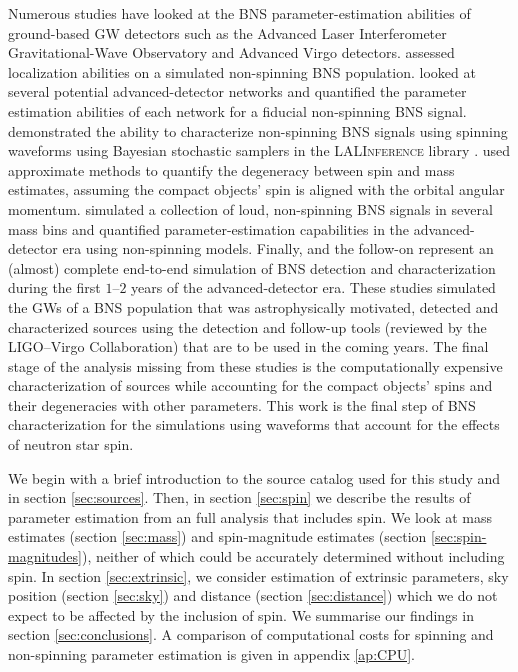 Numerous studies have looked at the BNS parameter-estimation abilities of ground-based GW detectors such as the Advanced Laser Interferometer Gravitational-Wave Observatory \citep[aLIGO;][]{Aasi_2015} and Advanced Virgo \citep[AdV;][]{Acernese_2014} detectors. \citet{Nissanke_2010,Nissanke_2011} assessed localization abilities on a simulated non-spinning BNS population. \citet{Veitch_2012} looked at several potential advanced-detector networks and quantified the parameter estimation abilities of each network for a fiducial non-spinning BNS signal. \citet{Aasi_2013} demonstrated the ability to characterize non-spinning BNS signals using spinning waveforms using Bayesian stochastic samplers in the \textsc{LALInference} library \citep{Veitch_2014}.  \citet{Hannam_2013} used approximate methods to quantify the degeneracy between spin and mass estimates, assuming the compact objects' spin is aligned with the orbital angular momentum. \citet{Rodriguez_2014} simulated a collection of loud, non-spinning BNS signals in several mass bins and quantified parameter-estimation capabilities in the advanced-detector era using non-spinning models.  Finally, \citet{Singer_2014} and the follow-on \citet{Berry_2014} represent an (almost) complete end-to-end simulation of BNS detection and characterization during the first $1$--$2$ years of the advanced-detector era. These studies simulated the GWs of a BNS population that was astrophysically motivated, detected and characterized sources using the detection and follow-up tools (reviewed by the LIGO--Virgo Collaboration) that are to be used in the coming years.   The final stage of the analysis missing from these studies is the computationally expensive characterization of sources while accounting for the compact objects' spins and their degeneracies with other parameters.  This work is the final step of BNS characterization for the \citet{Singer_2014} simulations using waveforms that account for the effects of neutron star spin.

We begin with a brief introduction to the source catalog used for this study and \citet{Singer_2014} in section \ref{sec:sources}. Then, in section \ref{sec:spin} we describe the results of parameter estimation from an full analysis that includes spin. We look at mass estimates (section \ref{sec:mass}) and spin-magnitude estimates (section \ref{sec:spin-magnitudes}), neither of which could be accurately determined without including spin. In section \ref{sec:extrinsic}, we consider estimation of extrinsic parameters, sky position (section \ref{sec:sky}) and distance (section \ref{sec:distance}) which we do not expect to be affected by the inclusion of spin. We summarise our findings in section \ref{sec:conclusions}. A comparison of computational costs for spinning and non-spinning parameter estimation is given in appendix \ref{ap:CPU}.
    